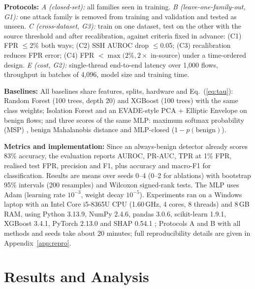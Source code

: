 \documentclass[pdflatex,sn-mathphys-num,iicol]{sn-jnl}%
\begin{document}
\textbf{Protocols:} \emph{A (closed-set):} all families seen in training. \emph{B (leave-one-family-out, G1):} one attack family is removed from training and validation and tested as unseen. \emph{C (cross-dataset, G3):} train on one dataset, test on the other with the source threshold and after recalibration, against criteria fixed in advance: (C1) FPR $\le$2\% both ways; (C2) SSH AUROC drop $\le$0.05; (C3) recalibration reduces FPR error; (C4) FPR $<\max(2\%,2\times$ in-source) under a time-ordered design. \emph{E (cost, G2):} single-thread end-to-end latency over 1,000 flows, throughput in batches of 4,096, model size and training time.

\textbf{Baselines:} All baselines share features, splits, hardware and Eq.~(\ref{eq:tau}): Random Forest (100 trees, depth 20) \cite{pedregosa2011sklearn} and XGBoost (100 trees) \cite{chen2016xgboost} with the same class weights; Isolation Forest \cite{liu2008iforest} and an EVADE-style PCA + Elliptic Envelope \cite{rousseeuw1999mcd,haynes2025evade} on benign flows; and three scores of the same MLP: maximum softmax probability (MSP) \cite{hendrycks2017msp}, benign Mahalanobis distance \cite{lee2018mahalanobis} and MLP-closed ($1-p(\text{benign})$).

\textbf{Metrics and implementation:} Since an always-benign detector already scores 83\% accuracy, the evaluation reports AUROC, PR-AUC, TPR at 1\% FPR, realised test FPR, precision and F1, plus accuracy and macro-F1 for classification. Results are means over seeds 0--4 (0--2 for ablations) with bootstrap 95\% intervals (200 resamples) and Wilcoxon signed-rank tests. The MLP uses Adam (learning rate $10^{-3}$, weight decay $10^{-5}$). Experiments ran on a Windows laptop with an Intel Core i5-8365U CPU (1.60\,GHz, 4 cores, 8 threads) and 8\,GB RAM, using Python 3.13.9, NumPy 2.4.6, pandas 3.0.6, scikit-learn 1.9.1, XGBoost 3.4.1, PyTorch 2.13.0 \cite{paszke2019pytorch} and SHAP 0.54.1 \cite{lundberg2017shap}; Protocols A and B with all methods and seeds take about 20 minutes; full reproducibility details are given in Appendix~\ref{app:repro}.

\section{Results and Analysis}\label{sec:results}
\end{document}
